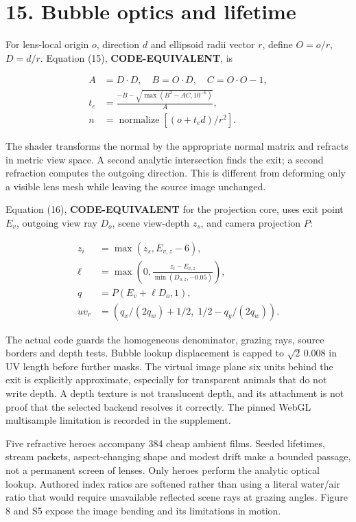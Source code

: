 \documentclass[
  english,
  11pt,
]{article}
\begin{document}
\section{15. Bubble optics and
lifetime}\label{bubble-optics-and-lifetime}

For lens-local origin \(o\), direction \(d\) and ellipsoid radii vector
\(r\), define \(O=o/r\), \(D=d/r\). Equation (15),
\textbf{CODE-EQUIVALENT}, is

\[
\begin{aligned}
A&=D\cdot D,\quad B=O\cdot D,\quad C=O\cdot O-1,\\
t_e&=\frac{-B-\sqrt{\max(B^2-AC,10^{-6})}}{A},\\
n&=\operatorname{normalize}[(o+t_ed)/r^2].
\end{aligned}
\]

The shader transforms the normal by the appropriate normal matrix and
refracts in metric view space. A second analytic intersection finds the
exit; a second refraction computes the outgoing direction. This is
different from deforming only a visible lens mesh while leaving the
source image unchanged.

Equation (16), \textbf{CODE-EQUIVALENT} for the projection core, uses
exit point \(E_v\), outgoing view ray \(D_o\), scene view-depth \(z_s\),
and camera projection \(P\):

\[
\begin{aligned}
z_i&=\max(z_s,E_{v,z}-6),\\
\ell&=\max\left(0,\frac{z_i-E_{v,z}}{\min(D_{o,z},-0.05)}\right),\\
q&=P(E_v+\ell D_o,1),\\
uv_r&=(q_x/(2q_w)+1/2,\;1/2-q_y/(2q_w)).
\end{aligned}
\]

The actual code guards the homogeneous denominator, grazing rays, source
borders and depth tests. Bubble lookup displacement is capped to
\(\sqrt{2}\,0.008\) in UV length before further masks. The virtual image
plane six units behind the exit is explicitly approximate, especially
for transparent animals that do not write depth. A depth texture is not
translucent depth, and its attachment is not proof that the selected
backend resolves it correctly. The pinned WebGL multisample limitation
is recorded in the supplement.

Five refractive heroes accompany 384 cheap ambient films. Seeded
lifetimes, stream packets, aspect-changing shape and modest drift make a
bounded passage, not a permanent screen of lenses. Only heroes perform
the analytic optical lookup. Authored index ratios are softened rather
than using a literal water/air ratio that would require unavailable
reflected scene rays at grazing angles. Figure 8 and S5 expose the image
bending and its limitations in motion.
\end{document}
